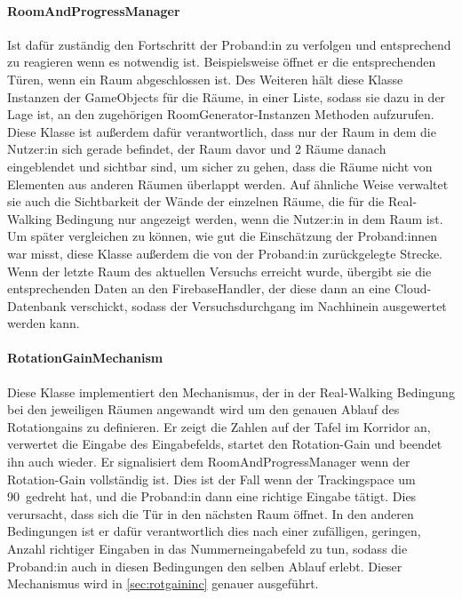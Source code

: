 \begin{multicols*}{2}
    \paragraph{RoomAndProgressManager}
    Ist dafür zuständig den Fortschritt der Proband:in zu verfolgen und entsprechend zu reagieren wenn es notwendig ist. Beispielsweise öffnet er die entsprechenden Türen, wenn ein Raum abgeschlossen ist.
    Des Weiteren hält diese Klasse Instanzen der GameObjects für die Räume, in einer Liste, sodass sie dazu in der Lage ist, an den zugehörigen RoomGenerator-Instanzen Methoden aufzurufen. Diese Klasse ist außerdem dafür verantwortlich, dass nur der Raum in dem die Nutzer:in sich gerade befindet, der Raum davor und 2 Räume danach eingeblendet und sichtbar sind, um sicher zu gehen, dass die Räume nicht von Elementen aus anderen Räumen überlappt werden. Auf ähnliche Weise verwaltet sie auch die Sichtbarkeit der Wände der einzelnen Räume, die für die Real-Walking Bedingung nur angezeigt werden, wenn die Nutzer:in in dem Raum ist.
    Um später vergleichen zu können, wie gut die Einschätzung der Proband:innen war misst, diese Klasse außerdem die von der Proband:in zurückgelegte Strecke. Wenn der letzte Raum des aktuellen Versuchs erreicht wurde, übergibt sie die entsprechenden Daten an den FirebaseHandler, der diese dann an eine Cloud-Datenbank verschickt, sodass der Versuchsdurchgang im Nachhinein ausgewertet werden kann.

    \paragraph{RotationGainMechanism}

    Diese Klasse implementiert den Mechanismus, der in der Real-Walking Bedingung bei den jeweiligen Räumen angewandt wird um den genauen Ablauf des Rotationgains zu definieren. Er zeigt die Zahlen auf der Tafel im Korridor an, verwertet die Eingabe des Eingabefelds, startet den Rotation-Gain und beendet ihn auch wieder. Er signalisiert dem RoomAndProgressManager wenn der Rotation-Gain vollständig ist. Dies ist der Fall wenn der Trackingspace um
    90\textdegree\
    gedreht hat, und die Proband:in dann eine richtige Eingabe tätigt. Dies verursacht, dass sich die Tür in den nächsten Raum öffnet. In den anderen Bedingungen ist er dafür verantwortlich dies nach einer zufälligen, geringen, Anzahl richtiger Eingaben in das Nummerneingabefeld zu tun, sodass die Proband:in auch in diesen Bedingungen den selben Ablauf erlebt. Dieser Mechanismus wird in \autoref{sec:rotgaininc} genauer ausgeführt.


\end{multicols*}
